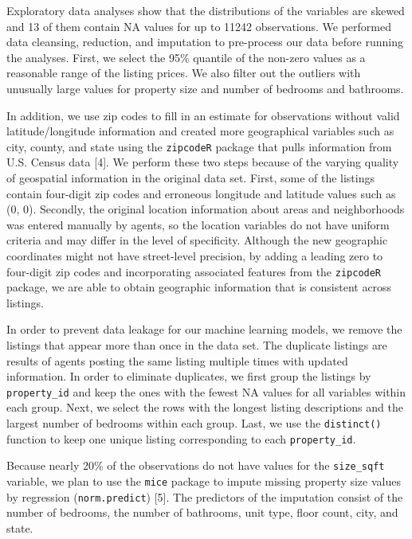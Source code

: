\documentclass[10pt,letterpaper]{article}
\begin{document}
Exploratory data analyses show that the distributions of the variables
are skewed and 13 of them contain NA values for up to 11242
observations. We performed data cleansing, reduction, and imputation to
pre-process our data before running the analyses. First, we select the
95\% quantile of the non-zero values as a reasonable range of the
listing prices. We also filter out the outliers with unusually large
values for property size and number of bedrooms and bathrooms.

In addition, we use zip codes to fill in an estimate for observations
without valid latitude/longitude information and created more
geographical variables such as city, county, and state using the
\texttt{zipcodeR} package that pulls information from U.S. Census data
{[}4{]}. We perform these two steps because of the varying quality of
geospatial information in the original data set. First, some of the
listings contain four-digit zip codes and erroneous longitude and
latitude values such as (0, 0). Secondly, the original location
information about areas and neighborhoods was entered manually by
agents, so the location variables do not have uniform criteria and may
differ in the level of specificity. Although the new geographic
coordinates might not have street-level precision, by adding a leading
zero to four-digit zip codes and incorporating associated features from
the \texttt{zipcodeR} package, we are able to obtain geographic
information that is consistent across listings.

In order to prevent data leakage for our machine learning models, we
remove the listings that appear more than once in the data set. The
duplicate listings are results of agents posting the same listing
multiple times with updated information. In order to eliminate
duplicates, we first group the listings by \texttt{property\_id} and
keep the ones with the fewest NA values for all variables within each
group. Next, we select the rows with the longest listing descriptions
and the largest number of bedrooms within each group. Last, we use the
\texttt{distinct()} function to keep one unique listing corresponding to
each \texttt{property\_id}.

Because nearly 20\% of the observations do not have values for the
\texttt{size\_sqft} variable, we plan to use the \texttt{mice} package
to impute missing property size values by regression
(\texttt{norm.predict}) {[}5{]}. The predictors of the imputation
consist of the number of bedrooms, the number of bathrooms, unit type,
floor count, city, and state.
\end{document}
